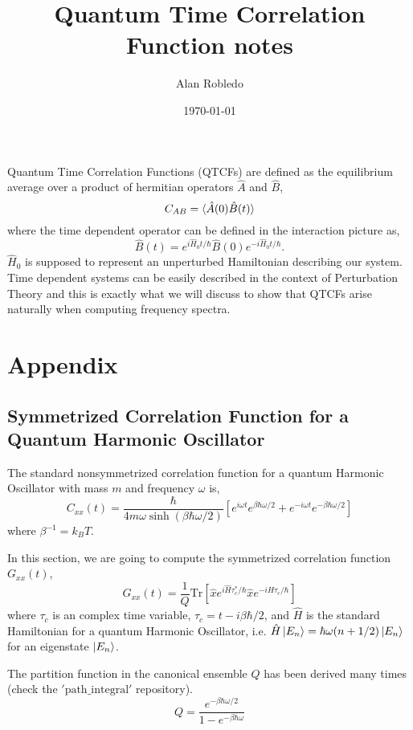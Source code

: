 \documentclass{article}
\title{Quantum Time Correlation Function notes}
\date{\today}
\author{Alan Robledo}
\newcommand{\be}{\begin{equation*}}
\newcommand{\ee}{\end{equation*}}
\begin{document}
\maketitle
Quantum Time Correlation Functions (QTCFs) are defined as the equilibrium average over a product of hermitian operators $\hat{A}$ and $\hat{B}$,
\be
  C_{AB} = \braket{\hat{A}(0) \hat{B}(t)}
\ee
where the time dependent operator can be defined in the interaction picture as,
\be
  \hat{B}(t) = e^{i \hat{H}_0 t/ \hbar} \hat{B}(0) e^{-i \hat{H}_0 t/ \hbar} .
\ee
$\hat{H}_0$ is supposed to represent an unperturbed Hamiltonian describing our system. Time dependent systems can be easily described in the context of Perturbation Theory and this is exactly what we will discuss to show that QTCFs arise naturally when computing frequency spectra.


\section{Appendix}
\subsection{Symmetrized Correlation Function for a Quantum Harmonic Oscillator}
The standard nonsymmetrized correlation function for a quantum Harmonic Oscillator with mass $m$ and frequency $\omega$ is,
\be
  C_{xx}(t) = \frac{\hbar}{4 m \omega \sinh(\beta \hbar \omega/2)} \left[ e^{i \omega t} e^{\beta \hbar \omega/2} + e^{-i \omega t} e^{-\beta \hbar \omega/2} \right]
\ee
where $\beta^{-1} = k_B T$.

In this section, we are going to compute the symmetrized correlation function $G_{xx}(t)$,
\be
  G_{xx}(t) = \frac{1}{Q} \text{Tr} \left[ \hat{x} e^{i \hat{H} \tau^*_c / \hbar} \hat{x} e^{-i \hat{H} \tau_c / \hbar}\right]
\ee
where $\tau_c$ is an complex time variable, $\tau_c = t - i\beta \hbar/2$, and $\hat{H}$ is the standard Hamiltonian for a quantum Harmonic Oscillator, i.e. $\hat{H} \ket{E_n} = \hbar \omega(n+1/2) \ket{E_n}$ for an eigenstate $\ket{E_n}$.

The partition function in the canonical ensemble $Q$ has been derived many times (check the $'\text{path}\_\text{integral}'$ repository).
\be
  Q = \frac{e^{-\beta \hbar \omega/2}}{1-e^{-\beta \hbar \omega}}
\ee
\end{document}
